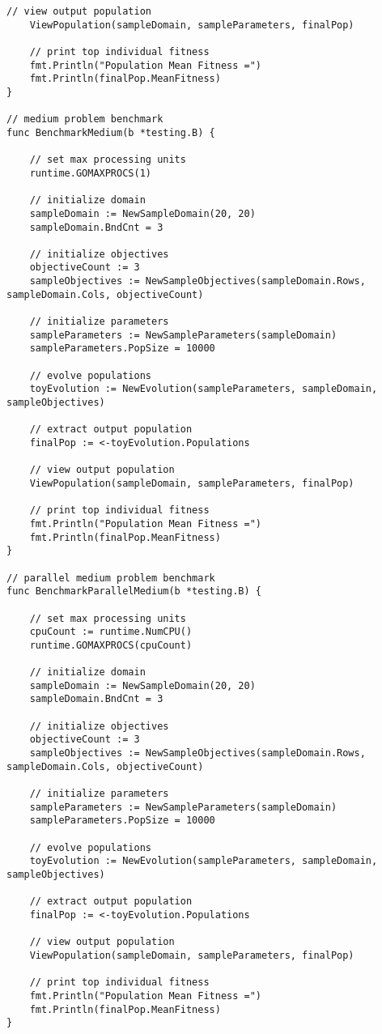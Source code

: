 \begin{lstlisting}[basicstyle=\tiny]
	// view output population
	ViewPopulation(sampleDomain, sampleParameters, finalPop)

	// print top individual fitness
	fmt.Println("Population Mean Fitness =")
	fmt.Println(finalPop.MeanFitness)
}

// medium problem benchmark
func BenchmarkMedium(b *testing.B) {

	// set max processing units
	runtime.GOMAXPROCS(1)

	// initialize domain
	sampleDomain := NewSampleDomain(20, 20)
	sampleDomain.BndCnt = 3

	// initialize objectives
	objectiveCount := 3
	sampleObjectives := NewSampleObjectives(sampleDomain.Rows, sampleDomain.Cols, objectiveCount)

	// initialize parameters
	sampleParameters := NewSampleParameters(sampleDomain)
	sampleParameters.PopSize = 10000

	// evolve populations
	toyEvolution := NewEvolution(sampleParameters, sampleDomain, sampleObjectives)

	// extract output population
	finalPop := <-toyEvolution.Populations

	// view output population
	ViewPopulation(sampleDomain, sampleParameters, finalPop)

	// print top individual fitness
	fmt.Println("Population Mean Fitness =")
	fmt.Println(finalPop.MeanFitness)
}

// parallel medium problem benchmark
func BenchmarkParallelMedium(b *testing.B) {

	// set max processing units
	cpuCount := runtime.NumCPU()
	runtime.GOMAXPROCS(cpuCount)

	// initialize domain
	sampleDomain := NewSampleDomain(20, 20)
	sampleDomain.BndCnt = 3

	// initialize objectives
	objectiveCount := 3
	sampleObjectives := NewSampleObjectives(sampleDomain.Rows, sampleDomain.Cols, objectiveCount)

	// initialize parameters
	sampleParameters := NewSampleParameters(sampleDomain)
	sampleParameters.PopSize = 10000

	// evolve populations
	toyEvolution := NewEvolution(sampleParameters, sampleDomain, sampleObjectives)

	// extract output population
	finalPop := <-toyEvolution.Populations

	// view output population
	ViewPopulation(sampleDomain, sampleParameters, finalPop)

	// print top individual fitness
	fmt.Println("Population Mean Fitness =")
	fmt.Println(finalPop.MeanFitness)
}


\end{lstlisting}
